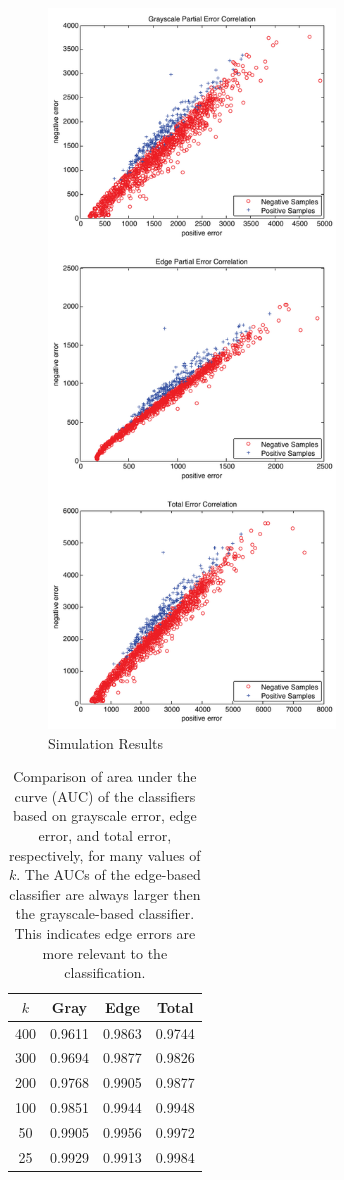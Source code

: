 \documentclass[10pt, conference, compsocconf]{IEEEtran}
\begin{document}
\begin{figure}[t]
\centering
\includegraphics[width=3in]{dist_gray_vs_edge}
\caption{Simulation Results}
\label{dist_gray_vs_edge}
\end{figure}

\begin{table}
  \caption{Comparison of area under the curve (AUC) of the classifiers based on grayscale error, edge error, and total error, respectively, for many values of $k$. The AUCs of the edge-based classifier are always larger then the grayscale-based classifier. This indicates edge errors are more relevant to the classification.}
  \begin{center}
    \begin{tabular}{  c | c  c  c  }
      \hline
      $k$ & Gray & Edge & Total \\
      \hline
      400 & 0.9611 & 0.9863 & 0.9744 \\
      300 & 0.9694 & 0.9877 & 0.9826 \\ 
      200 & 0.9768 & 0.9905 & 0.9877 \\
      100 & 0.9851 & 0.9944 & 0.9948 \\
      50  & 0.9905 & 0.9956 & 0.9972 \\
      25  & 0.9929 & 0.9913 & 0.9984 \\
      \hline  
    \end{tabular}
  \end{center}
  \label{table_gray_vs_edge}
\end{table}
\end{document}
